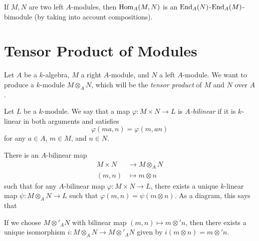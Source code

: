 \begin{remark}
  If $M, N$ are two left $A$-modules, then
  $\operatorname{Hom}_A(M, N)$ 
  is an $\operatorname{End}_A(N)$-$\operatorname{End}_A(M)$-bimodule
  (by taking into account compositions).
\end{remark}

\section{Tensor Product of Modules}

\begin{remark}
  Let $A$ be a $k$-algebra,
  $M$ a right $A$-module, and $N$ a
  left $A$-module. We want to produce
  a $k$-module $M \otimes_A N$, which
  will be the \emph{tensor product} of
  $M$ and $N$ over $A$.
\end{remark}

\begin{definition}
  Let $L$ be a $k$-module. We say that
  a map $\varphi : M \times N \to L$
  is \emph{$A$-bilinear} if it is $k$-linear
  in both arguments and satisfies
  \[
    \varphi(ma, n) = \varphi(m, an)
  \]
  for any $a \in A$, $m \in M$, and
  $n \in N$.
\end{definition}

\begin{definition}
  There is an $A$-bilinear map
  \begin{align*}
    M \times N &\longrightarrow M \otimes_A N \\
    (m, n) &\longmapsto m \otimes n
  \end{align*}
  such that for any $A$-bilinear map
  $\varphi : M \times N \to L$, there
  exists a unique $k$-linear map
  $\psi : M \otimes_A N \to L$ such that
  $\varphi(m, n) = \psi(m \otimes n)$.
  As a diagram, this says that
  \begin{center}
  \end{center}
\end{definition}

\begin{exercise}
  If we choose $M \otimes'_A N$ with
  bilinear map $(m, n) \mapsto m \otimes' n$,
  then there exists a unique isomorphism
  $i : M \otimes_A N \to M \otimes'_A N$
  given by $i(m \otimes n) = m \otimes' n$.
\end{exercise}

